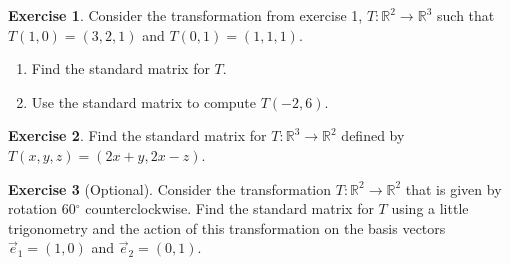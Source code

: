 \documentclass{beamer}
\newcommand{\R}{\mathbb{R}}
\newcommand{\fn}{\insertframenumber}
\theoremstyle{definition}
\newtheorem{exercise}{Exercise}
\renewcommand{\emph}[1]{{\color{blue}\texttt{#1}}}
\newenvironment{statementblock}[1]{%
	\setbeamercolor{block body}{bg=Gold!20}
	\setbeamercolor{block title}{bg=Gold}
	\begin{block}{\textbf{#1.}}}{\end{block}}
\begin{document}
\begin{frame}{\fn}
	\begin{exercise}
		Consider the transformation from exercise 1, $T:\R^2\to\R^3$ such that $T(1,0)=(3,2,1)$ and $T(0,1)=(1,1,1)$.
		\begin{enumerate}[label=(\alph*)]
			\item 
			Find the standard matrix for $T$.
			\item
			Use the standard matrix to compute $T(-2,6)$.
		\end{enumerate}
	\end{exercise}
	\begin{exercise}
		Find the standard matrix for $T\colon \R^3\to\R^2$ defined by $T(x,y,z)=(2x+y,2x-z)$.
	\end{exercise}
	\begin{exercise}[Optional]
		Consider the transformation $T\colon \R^2\to\R^2$ that is given by rotation 60$^\circ$ counterclockwise. Find the standard matrix for $T$ using a little trigonometry and the action of this transformation on the basis vectors $\vec e_1=(1,0)$ and $\vec e_2=(0,1)$.
	\end{exercise}
\end{frame}
\end{document}
